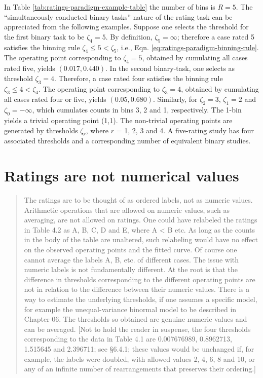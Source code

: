 \documentclass[
]{book}
\begin{document}
In Table \ref{tab:ratings-paradigm-example-table} the number of bins is \(R = 5\). The ``simultaneously conducted binary tasks'' nature of the rating task can be appreciated from the following examples. Suppose one selects the threshold for the first binary task to be \(\zeta_4 = 5\). By definition, \(\zeta_5 = \infty\); therefore a case rated 5 satisfies the binning rule \(\zeta_4 \leq 5 < \zeta_5\), i.e., Eqn. \eqref{eq:ratings-paradigm-binning-rule}. The operating point corresponding to \(\zeta_4 = 5\), obtained by cumulating all cases rated five, yields \((0.017, 0.440)\). In the second binary-task, one selects as threshold \(\zeta_3 = 4\). Therefore, a case rated four satisfies the binning rule \(\zeta_3 \leq 4 < \zeta_4\). The operating point corresponding to \(\zeta_3 = 4\), obtained by cumulating all cases rated four or five, yields \((0.05, 0.680)\). Similarly, for \(\zeta_2 = 3\), \(\zeta_1 = 2\) and \(\zeta_0 = -\infty\), which cumulates counts in bins 3, 2 and 1, respectively. The 1-bin yields a trivial operating point (1,1). The non-trivial operating points are generated by thresholds \(\zeta_r\), where \(r\) = 1, 2, 3 and 4. A five-rating study has four associated thresholds and a corresponding number of equivalent binary studies.

\hypertarget{binary-task-ratings-not-numerical-values}{%
\section{Ratings are not numerical values}\label{binary-task-ratings-not-numerical-values}}

\begin{quote}
The ratings are to be thought of as ordered labels, not as numeric values. Arithmetic operations that are allowed on numeric values, such as averaging, are not allowed on ratings. One could have relabeled the ratings in Table 4.2 as A, B, C, D and E, where A \textless{} B etc. As long as the counts in the body of the table are unaltered, such relabeling would have no effect on the observed operating points and the fitted curve. Of course one cannot average the labels A, B, etc. of different cases. The issue with numeric labels is not fundamentally different. At the root is that the difference in thresholds corresponding to the different operating points are not in relation to the difference between their numeric values. There is a way to estimate the underlying thresholds, if one assumes a specific model, for example the unequal-variance binormal model to be described in Chapter 06. The thresholds so obtained are genuine numeric values and can be averaged. {[}Not to hold the reader in suspense, the four thresholds corresponding to the data in Table 4.1 are 0.007676989, 0.8962713, 1.515645 and 2.396711; see §6.4.1; these values would be unchanged if, for example, the labels were doubled, with allowed values 2, 4, 6, 8 and 10, or any of an infinite number of rearrangements that preserves their ordering.{]}
\end{quote}
\end{document}
